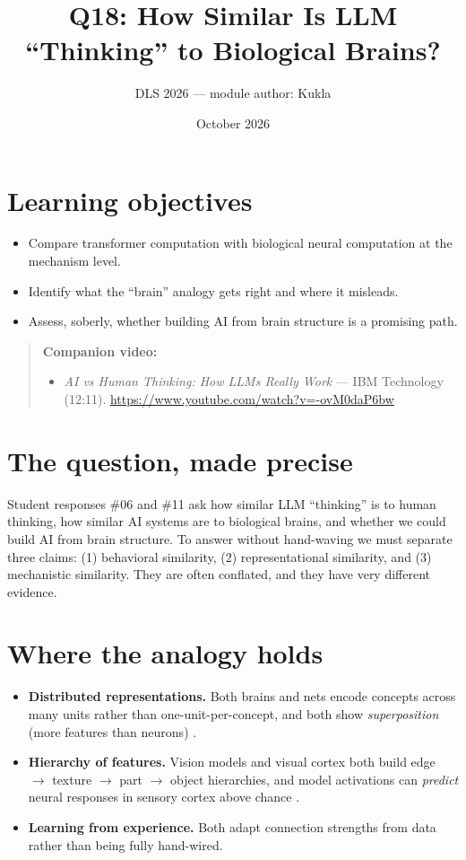 \documentclass[11pt]{article}
\title{Q18: How Similar Is LLM ``Thinking'' to Biological Brains?}
\author{DLS 2026 --- module author: Kukla}
\date{October 2026}
\begin{document}
\maketitle

\section*{Learning objectives}
\begin{itemize}[leftmargin=1.4em]
\item Compare transformer computation with biological neural computation at the mechanism level.
\item Identify what the ``brain'' analogy gets right and where it misleads.
\item Assess, soberly, whether building AI from brain structure is a promising path.
\end{itemize}

\begin{quote}\small\textbf{Companion video:}\begin{itemize}\setlength\itemsep{0pt}\item \emph{AI vs Human Thinking: How LLMs Really Work} --- IBM Technology (12:11). \url{https://www.youtube.com/watch?v=-ovM0daP6bw}\end{itemize}\end{quote}

\section{The question, made precise}
Student responses \#06 and \#11 ask how similar LLM ``thinking'' is to human thinking, how similar AI
systems are to biological brains, and whether we could build AI from brain structure. To answer without
hand-waving we must separate three claims: (1) behavioral similarity, (2) representational similarity,
and (3) mechanistic similarity. They are often conflated, and they have very different evidence.

\section{Where the analogy holds}
\begin{itemize}[leftmargin=1.4em]
\item \textbf{Distributed representations.} Both brains and nets encode concepts across many units
rather than one-unit-per-concept, and both show \emph{superposition} (more features than
neurons) \citep{elhage2022superposition}.
\item \textbf{Hierarchy of features.} Vision models and visual cortex both build edge $\to$ texture
$\to$ part $\to$ object hierarchies, and model activations can \emph{predict} neural responses in
sensory cortex above chance \citep{yamins2014performance}.
\item \textbf{Learning from experience.} Both adapt connection strengths from data rather than being
fully hand-wired.
\end{itemize}
\end{document}
